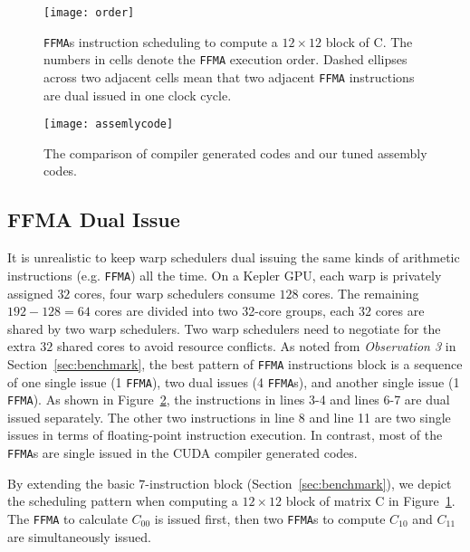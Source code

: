 \begin{figure}[htbp]
\begin{center}
\texttt{[image: order]}
\caption{\small {\tt FFMA}s instruction scheduling to compute a $12\times 12$ block of C.  The numbers in
cells denote the {\tt FFMA} execution order. Dashed ellipses across two adjacent cells mean that two adjacent {\tt FFMA} instructions are dual issued in one clock cycle.}
\label{fig:order}
\end{center}
\end{figure}

\begin{figure}[htbp]
\begin{center}
\texttt{[image: assemlycode]}
    \caption{\small The comparison of compiler generated codes and our tuned assembly codes.}
\label{fig:assemblycode}
\end{center}
\end{figure}
\subsection{FFMA Dual Issue}
\label{sec:ffma-dual}

It is unrealistic to keep warp schedulers dual issuing the same kinds of arithmetic instructions (e.g. {\tt FFMA}) all
the time. 
On a Kepler GPU, each warp is privately assigned $32$ cores, four warp schedulers consume $128$ cores. The remaining $192-128=64$ cores are divided into two 32-core groups, each $32$ cores
are shared by two warp schedulers. Two warp schedulers need to negotiate for the extra $32$ shared cores to avoid resource conflicts.
As noted from {\em Observation 3} in Section~\ref{sec:benchmark}, the best pattern of {\tt FFMA} instructions block is a sequence of one single issue (1
{\tt FFMA}), two dual issues (4 {\tt FFMA}s), and another single issue (1 {\tt FFMA}). As shown in
Figure~\ref{fig:assemblycode}, the instructions in lines 3-4 and lines 6-7 are dual issued separately.
The other two instructions in line 8 and line 11 are two single issues in terms of floating-point instruction
execution.
In contrast, most of the {\tt FFMA}s are single issued in the CUDA compiler generated codes.

By extending the basic $7$-instruction block (Section~\ref{sec:benchmark}), we depict the scheduling pattern when computing a $12\times 12$ block of matrix C in Figure~\ref{fig:order}.
The {\tt FFMA} to calculate $C_{00}$ is issued first, then two {\tt FFMA}s to
compute $C_{10}$ and $C_{11}$ are simultaneously issued. %

